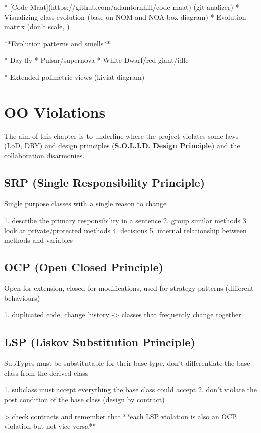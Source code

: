 * [Code Maat](https://github.com/adamtornhill/code-maat) (git analizer)
* Visualizing class evolution (base on NOM and NOA box diagram)
* Evolution matrix (don't scale, )


**Evolution patterns and smells**

* Day fly
* Pulsar/supernova
* White Dwarf/red giant/idle

* Extended polimetric views (kiviat diagram)

\chapter{OO Violations}

The aim of this chapter is to underline where the project violates 
some laws (LoD, DRY) and design principles (\textbf{S.O.L.I.D. Design Principle})
and the collaboration disarmonies.


\section{SRP (Single Responsibility Principle)}

Single purpose classes with a single reason to change

1. describe the primary responsibility in a sentence 
2. group similar methods
3. look at private/protected methods
4. decisions
5. internal relationship between methods and variables


\section{OCP (Open Closed Principle)}

Open for extension, closed for modifications, 
used for strategy patterns (different behaviours)

1. duplicated code, change history -> classes that frequently change together


\section{LSP (Liskov Substitution Principle)}

SubTypes must be substitutable for their base type,
don't differentiate the base class from the derived class

1. subclass must accept everything the base class could accept
2. don't violate the post condition of the base class (design by contract)

> check contracts and remember that **each LSP violation is also an OCP 
violation but not vice versa**


